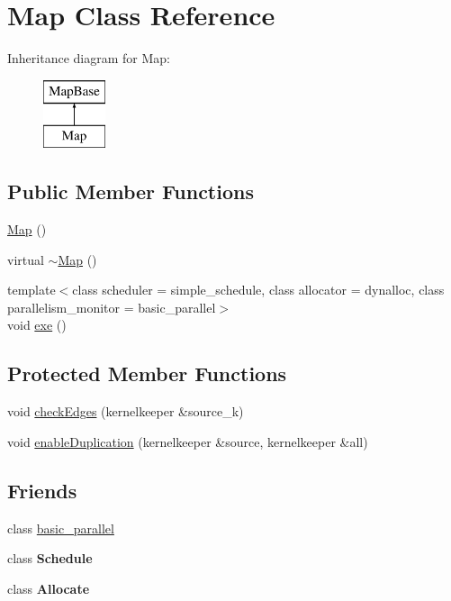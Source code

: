 \hypertarget{class_map}{}\section{Map Class Reference}
\label{class_map}
Inheritance diagram for Map\+:\begin{figure}[H]
\begin{center}
\leavevmode
\includegraphics[height=2.000000cm]{class_map}
\end{center}
\end{figure}
\subsection*{Public Member Functions}
\begin{DoxyCompactItemize}
\item 
\hyperlink{class_map_a0f5ad0fd4563497b4214038cbca8b582}{Map} ()
\item 
virtual \hyperlink{class_map_aa403fbe09394ccf39747588f5168e3b2}{$\sim$\+Map} ()
\item 
{\footnotesize template$<$class scheduler  = simple\+\_\+schedule, class allocator  = dynalloc, class parallelism\+\_\+monitor  = basic\+\_\+parallel$>$ }\\void \hyperlink{class_map_ad875bad2283446bfeed2f69752984c2d}{exe} ()
\end{DoxyCompactItemize}
\subsection*{Protected Member Functions}
\begin{DoxyCompactItemize}
\item 
void \hyperlink{class_map_adcaba5f11ec1b7fef29a0a1e62632373}{check\+Edges} (kernelkeeper \&source\+\_\+k)
\item 
void \hyperlink{class_map_aa8673192361b2e519e1c85bb0935e708}{enable\+Duplication} (kernelkeeper \&source, kernelkeeper \&all)
\end{DoxyCompactItemize}
\subsection*{Friends}
\begin{DoxyCompactItemize}
\item 
class \hyperlink{class_map_a901ac6fe1c35f3c114cf9e83f75dde0c}{basic\+\_\+parallel}
\item 
\hypertarget{class_map_aae5808dc2e987bf17ef42196457a654d}{}class {\bfseries Schedule}\label{class_map_aae5808dc2e987bf17ef42196457a654d}

\item 
\hypertarget{class_map_a64fd97b135f77d4b136e8fff9a1c1ae1}{}class {\bfseries Allocate}\label{class_map_a64fd97b135f77d4b136e8fff9a1c1ae1}

\end{DoxyCompactItemize}
